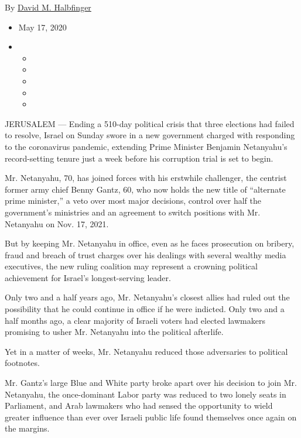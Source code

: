 By \href{https://www.nytimes3xbfgragh.onion/by/david-m-halbfinger}{David
M. Halbfinger}

\begin{itemize}
\item
  May 17, 2020
\item
  \begin{itemize}
  \item
  \item
  \item
  \item
  \item
  \end{itemize}
\end{itemize}

JERUSALEM --- Ending a 510-day political crisis that three elections had
failed to resolve, Israel on Sunday swore in a new government charged
with responding to the coronavirus pandemic, extending Prime Minister
Benjamin Netanyahu's record-setting tenure just a week before his
corruption trial is set to begin.

Mr. Netanyahu, 70, has joined forces with his erstwhile challenger, the
centrist former army chief Benny Gantz, 60, who now holds the new title
of ``alternate prime minister,'' a veto over most major decisions,
control over half the government's ministries and an agreement to switch
positions with Mr. Netanyahu on Nov. 17, 2021.

But by keeping Mr. Netanyahu in office, even as he faces prosecution on
bribery, fraud and breach of trust charges over his dealings with
several wealthy media executives, the new ruling coalition may represent
a crowning political achievement for Israel's longest-serving leader.

Only two and a half years ago, Mr. Netanyahu's closest allies had ruled
out the possibility that he could continue in office if he were
indicted. Only two and a half months ago, a clear majority of Israeli
voters had elected lawmakers promising to usher Mr. Netanyahu into the
political afterlife.

Yet in a matter of weeks, Mr. Netanyahu reduced those adversaries to
political footnotes.

Mr. Gantz's large Blue and White party broke apart over his decision to
join Mr. Netanyahu, the once-dominant Labor party was reduced to two
lonely seats in Parliament, and Arab lawmakers who had sensed the
opportunity to wield greater influence than ever over Israeli public
life found themselves once again on the margins.

